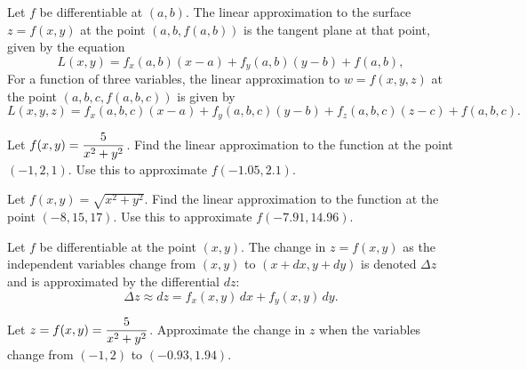 \documentclass[../mathNotesPreamble]{subfiles}
\begin{document}
  \begin{defn*}
    Let $f$ be differentiable at $(a,b)$. The linear approximation to the surface $z=f(x,y)$ at the point $(a,b,f(a,b))$ is the tangent plane at that point, given by the equation
      \[L(x,y)=f_x(a,b)(x-a)+f_y(a,b)(y-b)+f(a,b),\]
    For a function of three variables, the linear approximation to $w=f(x,y,z)$ at the point $(a,b,c,f(a,b,c))$ is given by
      \[L(x,y,z)=f_x(a,b,c)(x-a)+f_y(a,b,c)(y-b)+f_z(a,b,c)(z-c)+f(a,b,c).\]
  \end{defn*}
  \pagebreak

  \begin{ex*}
    Let $f(x,y)=\displaystyle\frac{5}{x^2+y^2}$. Find the linear approximation to the function at the point $(-1,2,1)$. Use this to approximate $f(-1.05, 2.1)$.
  \end{ex*}
  
  \begin{ex*}
    Let $f(x,y)=\sqrt{x^2+y^2}$. Find the linear approximation to the function at the point $(-8,15,17)$. Use this to approximate $f(-7.91, 14.96)$.
  \end{ex*}
  \pagebreak

  \begin{defn*}
    Let $f$ be differentiable at the point $(x,y)$. The change in $z=f(x,y)$ as the independent variables change from $(x,y)$ to $(x+dx, y+dy)$ is denoted $\Delta z$ and is approximated by the differential $dz$:
      \[\Delta z\approx dz= f_x(x,y)\,dx+f_y(x,y)\,dy.\]
  \end{defn*}

  \begin{ex*}
    Let $z=f(x,y)=\displaystyle\frac{5}{x^2+y^2}$. Approximate the change in $z$ when the variables change from $(-1,2)$ to $(-0.93, 1.94)$.
  \end{ex*}
  \pagebreak
\end{document}
